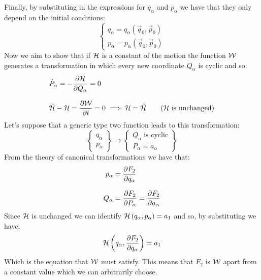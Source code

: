 Finally, by substituting in the expressions for $q_{\alpha}$ and $p_{\alpha}$ we have that they only depend on the initial conditions:
\begin{equation}
  \begin{cases}
    q_{\alpha} = q_{\alpha}(\vec{q}_0,\vec{p}_0)\\[8pt]
    p_{\alpha} = p_{\alpha}(\vec{q}_0,\vec{p}_0)
  \end{cases}
\end{equation}
Now we aim to show that if $\mathcal{H}$ is a constant of the motion the function $\mathcal{W}$ generates a transformation in which every new coordinate $Q_{\alpha}$ is cyclic and so:
\begin{equation}
  \begin{split}
    &\dot{P}_{\alpha} = -\pdv{\tilde{\hamfun}}{Q_{\alpha}} = 0\\[8pt]
    &\tilde{\hamfun} - \hamfun = \pdv{\hamch}{t} = 0 \implies \hamfun = \tilde{\hamfun} \quad \quad (\hamfun \text{ is unchanged})
  \end{split}
\end{equation}
Let's suppose that a generic type two function leads to this transformation:
\begin{equation}
  \begin{Bmatrix}
    q_{\alpha}\\
    p_{\alpha}
  \end{Bmatrix} \longrightarrow
  \begin{Bmatrix}
    Q_{\alpha} \; \text{is cyclic}\\
    P_{\alpha} = a_{\alpha}
  \end{Bmatrix}
\end{equation}
From the theory of canonical transformations we have that:
\begin{equation}
  \begin{split}
    p_{\alpha} &= \pdv{F_2}{q_{\alpha}}\\[8pt]
    Q_{\alpha} &= \pdv{F_2}{P_{\alpha}} = \pdv{F_2}{a_{\alpha}}
  \end{split}
\end{equation}
Since $\mathcal{H}$ is unchanged we can identify $\mathcal{H} \left(q_{\alpha},p_{\alpha}\right)= a_1$ and so, by substituting we have:
\begin{equation}
  \hamfun \brackets{q_{\alpha},\pdv{F_2}{q_{\alpha}}}= a_1
\end{equation}
Which is the equation that $\mathcal{W}$ must satisfy. This means that $F_2$ is $\mathcal{W}$ apart from a constant value which we can arbitrarily choose.\\
